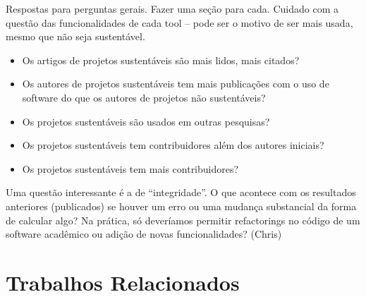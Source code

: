 \label{discussao}


Respostas para perguntas gerais. Fazer uma seção para cada.
Cuidado com a questão das funcionalidades de cada tool -- pode ser o motivo de ser mais usada,
mesmo que não seja sustentável.


\begin{itemize}
  \item Os artigos de projetos sustentáveis são mais lidos, mais citados?
  \item Os autores de projetos sustentáveis tem mais publicações 
com o uso de software do que os autores de projetos não sustentáveis?
  \item Os projetos sustentáveis são usados em outras pesquisas?
  \item Os projetos sustentáveis tem contribuidores além dos autores iniciais?
  \item Os projetos sustentáveis tem mais contribuidores?
\end{itemize}

Uma questão interessante é a de ``integridade''. 
O que acontece com os resultados anteriores (publicados)
se houver um erro ou uma mudança substancial da forma de calcular algo?
Na prática, só deveríamos permitir refactorings no código 
de um software acadêmico ou adição de novas funcionalidades?
(Chris)

\section{Trabalhos Relacionados}




